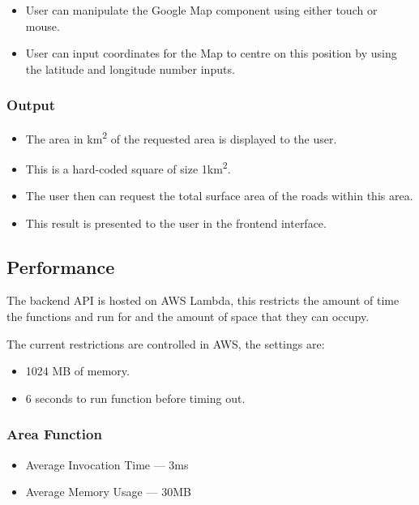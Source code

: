 \documentclass[a4paper,11pt]{article}
\begin{document}
\begin{itemize}
  \item User can manipulate the Google Map component using either touch or
    mouse.
  \item User can input coordinates for the Map to centre on this position by
    using the latitude and longitude number inputs.
\end{itemize}

\subsubsection{Output}

\begin{itemize}
  \item The area in km\textsuperscript{2} of the requested area is displayed to
    the user.
  \item This is a hard-coded square of size 1km\textsuperscript{2}.
  \item The user then can request the total surface area of the roads within
    this area.
  \item This result is presented to the user in the frontend interface.
\end{itemize}

\subsection{Performance}

The backend API is hosted on AWS Lambda, this restricts the amount of time the
functions and run for and the amount of space that they can occupy.

The current restrictions are controlled in AWS, the settings are:

\begin{itemize}
  \item 1024 MB of memory.
  \item 6 seconds to run function before timing out.
\end{itemize}

\subsubsection{Area Function}

\begin{itemize}
  \item Average Invocation Time --- 3ms
  \item Average Memory Usage --- 30MB
\end{itemize}
\end{document}
